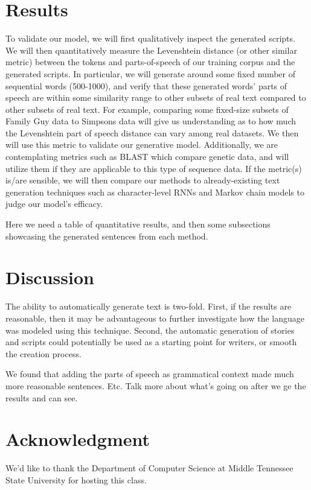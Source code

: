 \documentclass[conference]{IEEEtran}
\begin{document}
\section{Results}
To validate our model, we will first qualitatively inspect the generated scripts. We will then quantitatively measure the Levenshtein distance (or other similar metric) between the tokens and parts-of-speech of our training corpus and the generated scripts. In particular, we will generate around some fixed number of sequential words (500-1000), and verify that these generated words' parts of speech are within some similarity range to other subsets of real text compared to other subsets of real text. For example, comparing some fixed-size subsets of Family Guy data to Simpsons data will give us understanding as to how much the Levenshtein part of speech distance can vary among real datasets. We then will use this metric to validate our generative model. Additionally, we are contemplating metrics such as BLAST which compare genetic data, and will utilize them if they are applicable to this type of sequence data. If the metric(s) is/are sensible, we will then compare our methods to already-existing text generation techniques such as character-level RNNs and Markov chain models to judge our model's efficacy.

Here we need a table of quantitative results, and then some subsections showcasing the generated sentences from each method.

\section{Discussion}
The ability to automatically generate text is two-fold. First, if the results are reasonable, then it may be advantageous to further investigate how the language was modeled using this technique. Second, the automatic generation of stories and scripts could potentially be used as a starting point for writers, or smooth the creation process.

We found that adding the parts of speech as grammatical context made much more reasonable sentences.  Etc.  Talk more about what's going on after we ge the results and can see.

\section*{Acknowledgment}

We'd like to thank the Department of Computer Science at Middle Tennessee State University for hosting this class.




\end{document}
